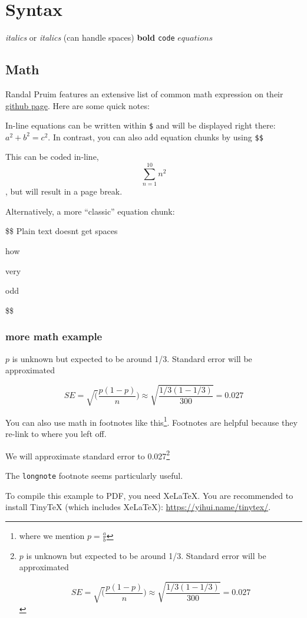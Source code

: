 \documentclass[
]{book}
\begin{document}
\hypertarget{syntax}{%
\section{Syntax}\label{syntax}}

\emph{italics} or
\emph{italics} (can handle spaces)
\textbf{bold}
\texttt{code}
\(equations\)

\hypertarget{math}{%
\subsection{Math}\label{math}}

Randal Pruim features an extensive list of common math expression on their \href{https://rpruim.github.io/s341/S19/from-class/MathinRmd.html}{github page}. Here are some quick notes:

In-line equations can be written within \texttt{\$} and will be displayed right there: \(a^2 + b^2 = c^2\). In contrast, you can also add equation chunks by using \texttt{\$\$}

This can be coded in-line, \[\sum_{n=1}^{10} n^2\], but will result in a page break.

Alternatively, a more ``classic'' equation chunk:

\$\$
Plain text doesnt get spaces

how

very

odd

\$\$

\hypertarget{more-math-example}{%
\subsubsection{more math example}\label{more-math-example}}

\(p\) is unknown but expected to be around 1/3. Standard error will be approximated

\[
SE = \sqrt(\frac{p(1-p)}{n}) \approx \sqrt{\frac{1/3 (1 - 1/3)} {300}} = 0.027
\]

You can also use math in footnotes like this\footnote{where we mention \(p = \frac{a}{b}\)}. Footnotes are helpful because they re-link to where you left off.

We will approximate standard error to 0.027\footnote{\(p\) is unknown but expected to be around 1/3. Standard error will be approximated

  \[
  SE = \sqrt(\frac{p(1-p)}{n}) \approx \sqrt{\frac{1/3 (1 - 1/3)} {300}} = 0.027
  \]}

The \texttt{longnote} footnote seems particularly useful.

To compile this example to PDF, you need XeLaTeX. You are recommended to install TinyTeX (which includes XeLaTeX): \url{https://yihui.name/tinytex/}.

  
\end{document}
